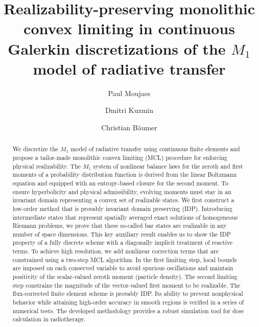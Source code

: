 \documentclass[preprint, 11pt]{elsarticle}
\begin{document}
\begin{frontmatter}
\title{Realizability-preserving monolithic convex limiting in continuous Galerkin discretizations of the $M_1$ model of radiative transfer}
\author[TUD]{Paul Moujaes}

\author[TUD]{Dmitri Kuzmin}

\address[TUD]{Institute of Applied Mathematics (LS III), TU Dortmund University\\ Vogelpothsweg 87,
  D-44227 Dortmund, Germany}

\author[WPE,WTZ,DKTK,TUDOPhy]{Christian Bäumer}

\address[WPE]{West German Proton Therapy Centre Essen
(WPE) gGmbH\\ Am Mühlenbach 1, 45147 Essen, Germany}
\address[WTZ]{West German Cancer Center (WTZ), Hufelandstr. 55, 45147 Essen, University Hospital Essen, Essen, Germany}
\address[DKTK]{German Cancer Consortium (DKTK), Hufelandstr. 55, 45147 Essen, Germany }
\address[TUDOPhy]{\\Department of Physics, TU Dortmund University, Otto-Hahn-Str. 4, 44227 Dortmund, Germany}


\journal{}

\begin{abstract}
  We discretize the $M_1$ model of radiative transfer using continuous finite elements and propose a tailor-made monolithic convex limiting (MCL) procedure for  enforcing physical realizability. The $M_1$ system of nonlinear balance laws for the zeroth and first moments of a probability distribution function is derived from the linear Boltzmann equation and equipped with an entropy-based closure for the second moment. To ensure hyperbolicity and physical admissibility, evolving moments must stay in an invariant domain representing a convex set of realizable states. We first construct a low-order method that is provably invariant domain preserving (IDP). Introducing intermediate states that represent spatially averaged exact solutions of homogeneous Riemann problems, we prove that these so-called bar states are realizable in any number of space dimensions. This key auxiliary result enables us to show the IDP property of a fully discrete scheme with a diagonally implicit treatment of reactive terms. To achieve high resolution, we add nonlinear correction terms that are constrained using a two-step MCL algorithm. In the first limiting step, local bounds are imposed on each conserved variable to avoid spurious oscillations and maintain positivity of the scalar-valued zeroth moment (particle density). The second limiting step constrains the magnitude of the vector-valued first moment to be realizable. The flux-corrected finite element scheme is provably IDP. Its ability to prevent nonphysical behavior while attaining high-order accuracy in smooth regions is verified in a series of numerical tests. The developed methodology provides a robust simulation tool for dose calculation in radiotherapy.
\end{abstract}


\end{frontmatter}
\end{document}
